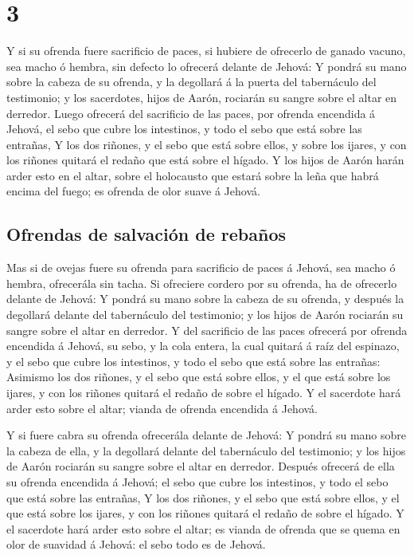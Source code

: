 \hypertarget{section-2}{%
\section{3}\label{section-2}}

 Y si su ofrenda fuere sacrificio de paces, si hubiere de
ofrecerlo de ganado vacuno, sea macho ó hembra, sin defecto lo ofrecerá
delante de Jehová:  Y pondrá su mano sobre la cabeza de su
ofrenda, y la degollará á la puerta del tabernáculo del testimonio; y
los sacerdotes, hijos de Aarón, rociarán su sangre sobre el altar en
derredor.  Luego ofrecerá del sacrificio de las paces, por
ofrenda encendida á Jehová, el sebo que cubre los intestinos, y todo el
sebo que está sobre las entrañas,  Y los dos riñones, y el
sebo que está sobre ellos, y sobre los ijares, y con los riñones quitará
el redaño que está sobre el hígado.  Y los hijos de Aarón
harán arder esto en el altar, sobre el holocausto que estará sobre la
leña que habrá encima del fuego; es ofrenda de olor suave á Jehová.

\hypertarget{ofrendas-de-salvaciuxf3n-de-rebauxf1os}{%
\subsection{Ofrendas de salvación de
rebaños}\label{ofrendas-de-salvaciuxf3n-de-rebauxf1os}}

 Mas si de ovejas fuere su ofrenda para sacrificio de paces
á Jehová, sea macho ó hembra, ofrecerála sin tacha.  Si
ofreciere cordero por su ofrenda, ha de ofrecerlo delante de Jehová:
 Y pondrá su mano sobre la cabeza de su ofrenda, y después
la degollará delante del tabernáculo del testimonio; y los hijos de
Aarón rociarán su sangre sobre el altar en derredor.  Y del
sacrificio de las paces ofrecerá por ofrenda encendida á Jehová, su
sebo, y la cola entera, la cual quitará á raíz del espinazo, y el sebo
que cubre los intestinos, y todo el sebo que está sobre las entrañas:
 Asimismo los dos riñones, y el sebo que está sobre ellos,
y el que está sobre los ijares, y con los riñones quitará el redaño de
sobre el hígado.  Y el sacerdote hará arder esto sobre el
altar; vianda de ofrenda encendida á Jehová.

 Y si fuere cabra su ofrenda ofrecerála delante de Jehová:
 Y pondrá su mano sobre la cabeza de ella, y la degollará
delante del tabernáculo del testimonio; y los hijos de Aarón rociarán su
sangre sobre el altar en derredor.  Después ofrecerá de
ella su ofrenda encendida á Jehová; el sebo que cubre los intestinos, y
todo el sebo que está sobre las entrañas,  Y los dos
riñones, y el sebo que está sobre ellos, y el que está sobre los ijares,
y con los riñones quitará el redaño de sobre el hígado.  Y
el sacerdote hará arder esto sobre el altar; es vianda de ofrenda que se
quema en olor de suavidad á Jehová: el sebo todo es de Jehová.

